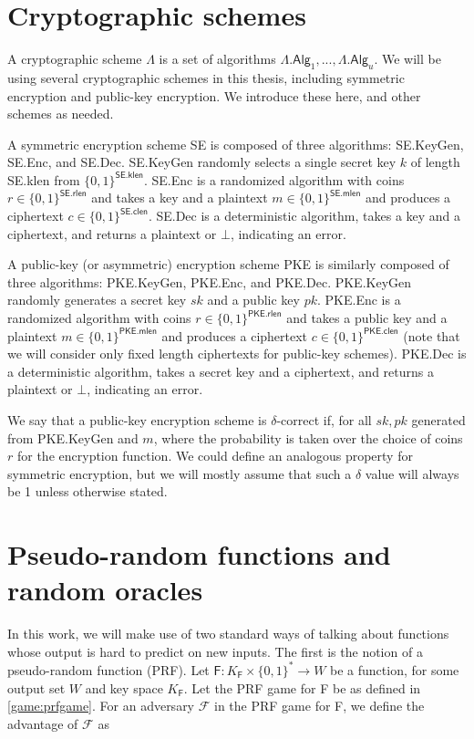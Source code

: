 \section{Cryptographic schemes}
A cryptographic scheme $\mathsf{\Lambda}$ is a set of algorithms $\mathsf{\Lambda.Alg}_1,..., \mathsf{\Lambda.Alg}_u$. We will be using several cryptographic schemes in this thesis, including symmetric encryption and public-key encryption. We introduce these here, and other schemes as needed.

A symmetric encryption scheme \textsf{SE} is composed of three algorithms: \textsf{SE.KeyGen}, \textsf{SE.Enc}, and \textsf{SE.Dec}. \textsf{SE.KeyGen} randomly selects a single secret key $k$ of length \textsf{SE.klen} from $\{0,1\}^\mathsf{SE.klen}$. \textsf{SE.Enc} is a randomized algorithm with coins $r\in \{0,1\}^\mathsf{SE.rlen}$ and takes a key and a plaintext $m\in \{0,1\}^\mathsf{SE.mlen}$ and produces a ciphertext $c\in \{0,1\}^\mathsf{SE.clen}$. \textsf{SE.Dec} is a deterministic algorithm, takes a key and a ciphertext, and returns a plaintext or $\bot$, indicating an error.

A public-key (or asymmetric) encryption scheme \textsf{PKE} is similarly composed of three algorithms: \textsf{PKE.KeyGen}, \textsf{PKE.Enc}, and \textsf{PKE.Dec}. \textsf{PKE.KeyGen} randomly generates a secret key $sk$ and a public key $pk$. \textsf{PKE.Enc} is a randomized algorithm with coins $r\in \{0,1\}^\mathsf{PKE.rlen}$ and takes a public key and a plaintext $m\in \{0,1\}^\mathsf{PKE.mlen}$ and produces a ciphertext $c\in \{0,1\}^\mathsf{PKE.clen}$ (note that we will consider only fixed length ciphertexts for public-key schemes). \textsf{PKE.Dec} is a deterministic algorithm, takes a secret key and a ciphertext, and returns a plaintext or $\bot$, indicating an error.

We say that a public-key encryption scheme is $\delta$-correct if, for all $sk,pk$ generated from \textsf{PKE.KeyGen} and $m$,
where the probability is taken over the choice of coins $r$ for the encryption function. We could define an analogous property for symmetric encryption, but we will mostly assume that such a $\delta$ value will always be 1 unless otherwise stated.

\section{Pseudo-random functions and random oracles}
In this work, we will make use of two standard ways of talking about functions whose output is hard to predict on new inputs. The first is the notion of a pseudo-random function (PRF). Let $\mathsf{F}:K_\mathsf{F}\times \{0,1\}^* \rightarrow W$ be a function, for some output set $W$ and key space $K_\mathsf{F}$. Let the PRF game for \textsf{F} be as defined in \autoref{game:prfgame}. For an adversary $\mathcal{F}$ in the PRF game for \textsf{F}, we define the advantage of $\mathcal{F}$ as

